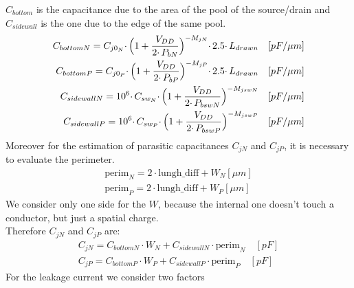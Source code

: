 $C_{bottom}$ is the capacitance due to the area of the pool of the source/drain and $C_{sidewall}$ is the one due to the edge of the same pool.
\begin{eqnarray}
C_{bottomN}=C_{j0_N} \cdotp \Bigl(1+ \frac{V_{DD}}{2 \cdotp P_{bN}} \Bigr)^{-M_{jN}} \cdotp 2.5 \cdotp L_{drawn} \quad [pF/\mu m]\\
C_{bottomP}=C_{j0_P} \cdotp \Bigl(1+ \frac{V_{DD}}{2 \cdotp P_{bP}} \Bigr)^{-M_{jP}} \cdotp 2.5 \cdotp L_{drawn} \quad [pF/\mu m]\\
C_{sidewallN}=10^6 \cdotp C_{sw_N} \cdotp \Bigl(1+ \frac{V_{DD}}{2 \cdotp P_{bswN}} \Bigr)^{-M_{jswN}} \quad [pF/\mu m]\\
C_{sidewallP}=10^6 \cdotp C_{sw_P} \cdotp \Bigl(1+ \frac{V_{DD}}{2 \cdotp P_{bswP}} \Bigr)^{-M_{jswP}} \quad [pF/\mu m]
\end{eqnarray}
Moreover for the estimation of parasitic capacitances $C_{jN}$ and $C_{jP}$, it is necessary to evaluate the perimeter.
\begin{eqnarray}
\text{perim}_N=2 \cdotp \text{lungh\_diff} + W_N [\mu m]\\
\text{perim}_P=2 \cdotp \text{lungh\_diff} + W_P [\mu m]
\end{eqnarray}
We consider only one side for the $W$, because the internal one doesn't touch a conductor, but just a spatial charge. \\Therefore $C_{jN}$ and $C_{jP}$ are:
\begin{eqnarray}
C_{jN}=C_{bottomN} \cdotp W_N + C_{sidewallN} \cdotp \text{perim}_N \quad [pF]\\
C_{jP}=C_{bottomP} \cdotp W_P + C_{sidewallP} \cdotp \text{perim}_P \quad [pF]
\end{eqnarray}
For the leakage current we consider two factors
